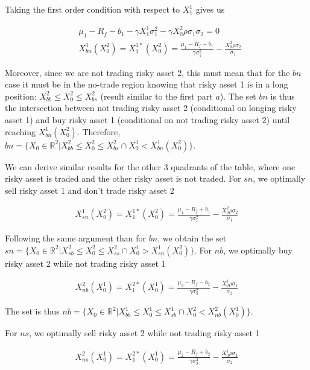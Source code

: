\documentclass[10pt]{article}
\begin{document}
Taking the first order condition with respect to $X_1^1$ gives us

\begin{align*}
	& \mu_1 - R_f - b_1 - \gamma X_1^1\sigma_1^2 - \gamma X_0^2 \rho \sigma_1 \sigma_2 = 0	\\
	& X_{bn}^1(X_0^2) =  X_1^{1*}(X_0^2)  = \frac{\mu_1 - R_f - b_1}{\gamma \sigma_1^2} - \frac{X_0^2 \rho  \sigma_2}{\sigma_1} 
\end{align*}

Moreover, since we are not trading risky asset 2, this must mean that for the  $bn$ case it must be in the no-trade region knowing that risky asset 1 is in a long position: $X_{bb}^2 \leq X_0^2 \leq X_{bs}^2$ (result similar to the first part $a$). The  set $bn $ is thus the intersection between not trading risky asset 2 (conditional on longing risky asset 1) and buy risky asset 1 (conditional on not trading risky asset 2) until reaching $X_{bn}^1(X_0^2)$. Therefore, $bn = \{ X_0 \in \mathbb{R}^2 \vert X_{bb}^2 \leq X_0^2 \leq X_{bs}^2 \cap X_0^1 < X_{bn}^1(X_0^2) \}$.

\bigbreak

We can derive similar results for the other 3 quadrants of the table, where one risky asset is traded and the other risky asset is not traded. For $sn$, we optimally sell risky asset 1 and don't trade risky asset 2

\begin{align*}
	X_{sn}^1(X_0^2) =  X_1^{1*}(X_0^2)  = \frac{\mu_1 - R_f + b_1}{\gamma \sigma_1^2} - \frac{X_0^2 \rho  \sigma_2}{\sigma_1}
\end{align*}

Following the same argument than for $bn$, we obtain the set $sn = \{ X_0 \in \mathbb{R}^2 \vert X_{sb}^2 \leq X_0^2 \leq X_{ss}^2 \cap X_0^1 > X_{sn}^1(X_0^2) \}$. For $nb$, we optimally buy risky asset 2 while not trading risky asset 1

\begin{align*}
	X_{nb}^2(X_0^1) =  X_1^{2*}(X_0^1)  = \frac{\mu_2 - R_f - b_2}{\gamma \sigma_2^2} - \frac{X_0^1 \rho  \sigma_1}{\sigma_2}
\end{align*}

The set is thus $nb = \{X_0 \in \mathbb{R}^2 \vert X_{bb}^1 \leq X_0^1 \leq X_{sb}^1 \cap X_0^2 < X_{nb}^2(X_0^1) \}$.

For $ns$, we optimally sell risky asset 2 while not trading risky asset 1

\begin{align*}
	X_{ns}^2(X_0^1) =  X_1^{2*}(X_0^1)  = \frac{\mu_2 - R_f + b_2}{\gamma \sigma_2^2} - \frac{X_0^1 \rho  \sigma_1}{\sigma_2}
\end{align*}
\end{document}
